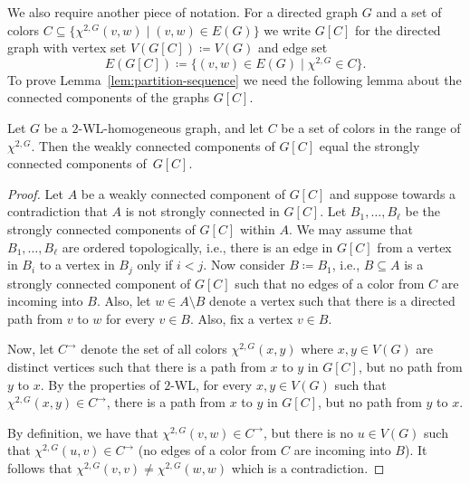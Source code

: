 \documentclass{theoretics}
\newcommand{\WL}[2]{\chi^{#1,#2}}
\begin{document}
We also require another piece of notation.
For a directed graph $G$ and a set of colors $C \subseteq \{\WL{2}{G}(v,w) \mid (v,w) \in E(G)\}$ we write $G[C]$ for the directed graph with vertex set $V(G[C]) \coloneqq V(G)$ and edge set
\[E(G[C]) \coloneqq \{(v,w) \in E(G) \mid \WL{2}{G} \in C\}.\]
To prove Lemma~\ref{lem:partition-sequence} we need the following lemma about the connected components of the graphs $G[C]$.

\begin{lemma}
 \label{lem:weakly-to-strongly-cc}
 Let $G$ be a $2$-WL-homogeneous graph, and let $C$ be a set of colors in the range of $\WL{2}{G}$.
 Then the weakly connected components of $G[C]$ equal the strongly connected components of~$G[C]$.
\end{lemma}

\begin{proof}
 Let $A$ be a weakly connected component of $G[C]$ and suppose towards a contradiction that $A$ is not strongly connected in $G[C]$.
 Let $B_1,\dots,B_\ell$ be the strongly connected components of $G[C]$ within $A$.
 We may assume that $B_1,\dots,B_\ell$ are ordered topologically, i.e., there is an edge in $G[C]$ from a vertex in $B_i$ to a vertex in $B_j$ only if $i < j$.
 Now consider $B \coloneqq B_1$, i.e., $B \subseteq A$ is a strongly connected component of $G[C]$ such that no edges of a color from $C$ are incoming into $B$.
 Also, let $w \in A \setminus B$ denote a vertex such that there is a directed path from $v$ to $w$ for every $v \in B$.
 Also, fix a vertex $v \in B$.

 Now, let $C^{\rightarrow}$ denote the set of all colors $\WL{2}{G}(x,y)$ where $x,y \in V(G)$ are distinct vertices such that there is a path from $x$ to $y$ in $G[C]$, but no path from $y$ to $x$.
 By the properties of $2$-WL, for every $x,y \in V(G)$ such that $\WL{2}{G}(x,y) \in C^{\rightarrow}$, there is a path from $x$ to $y$ in $G[C]$, but no path from $y$ to $x$.

 By definition, we have that $\WL{2}{G}(v,w) \in C^{\rightarrow}$, but there is no $u \in V(G)$ such that $\WL{2}{G}(u,v) \in C^{\rightarrow}$ (no edges of a color from $C$ are incoming into $B$).
 It follows that $\WL{2}{G}(v,v) \neq \WL{2}{G}(w,w)$ which is a contradiction.
\end{proof}
\end{document}
